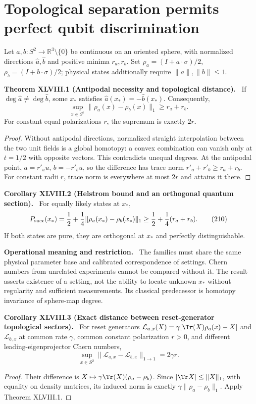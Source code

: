 \documentclass[11pt,a4paper,oneside]{book}
\newcommand{\R}{\mathbb R}\newcommand{\C}{\mathbb C}\newcommand{\Z}{\mathbb Z}\newcommand{\N}{\mathbb N}\newcommand{\Q}{\mathbb Q}
\newcommand{\statement}[3]{\par\medskip\noindent\textbf{#1 #2 (#3).}\ }
\newcommand{\note}[1]{\par\medskip\noindent\textbf{#1}\ }
\begin{document}
\section{Topological separation permits perfect qubit discrimination}
Let $a,b:S^2\to\R^3\setminus\{0\}$ be continuous on an oriented sphere, with normalized directions $\widehat a,\widehat b$ and positive minima $r_a,r_b$. Set $\rho_a=(I+a\cdot\sigma)/2$, $\rho_b=(I+b\cdot\sigma)/2$; physical states additionally require $\|a\|,\|b\|\le1$.
\statement{Theorem}{XLVIII.1}{Antipodal necessity and topological distance}
If $\deg\widehat a\ne\deg\widehat b$, some $x_*$ satisfies $\widehat a(x_*)=-\widehat b(x_*)$. Consequently,
\begin{equation}\sup_{x\in S^2}\|\rho_a(x)-\rho_b(x)\|_1\ge r_a+r_b.\tag{209}\end{equation}
For constant equal polarizations $r$, the supremum is exactly $2r$.
\begin{proof}
Without antipodal directions, normalized straight interpolation between the two unit fields is a global homotopy: a convex combination can vanish only at $t=1/2$ with opposite vectors. This contradicts unequal degrees. At the antipodal point, $a=r'_au$, $b=-r'_bu$, so the difference has trace norm $r'_a+r'_b\ge r_a+r_b$. For constant radii $r$, trace norm is everywhere at most $2r$ and attains it there.
\end{proof}
\statement{Corollary}{XLVIII.2}{Helstrom bound and an orthogonal quantum section}
For equally likely states at $x_*$,
\begin{equation}P_{\rm succ}(x_*)=\frac12+\frac14\|\rho_a(x_*)-\rho_b(x_*)\|_1\ge\frac12+\frac14(r_a+r_b).\tag{210}\end{equation}
If both states are pure, they are orthogonal at $x_*$ and perfectly distinguishable.
\note{Operational meaning and restriction.} The families must share the same physical parameter base and calibrated correspondence of settings. Chern numbers from unrelated experiments cannot be compared without it. The result asserts existence of a setting, not the ability to locate unknown $x_*$ without regularity and sufficient measurements. Its classical predecessor is homotopy invariance of sphere-map degree.
\statement{Corollary}{XLVIII.3}{Exact distance between reset-generator topological sectors}
For reset generators $\mathcal L_{a,x}(X)=\gamma[\Tr(X)\rho_a(x)-X]$ and $\mathcal L_{b,x}$ at common rate $\gamma$, common constant polarization $r>0$, and different leading-eigenprojector Chern numbers,
\begin{equation}\sup_{x\in S^2}\|\mathcal L_{a,x}-\mathcal L_{b,x}\|_{1\to1}=2\gamma r.\tag{211}\end{equation}
\begin{proof}
Their difference is $X\mapsto\gamma\Tr(X)(\rho_a-\rho_b)$. Since $|\Tr X|\le\|X\|_1$, with equality on density matrices, its induced norm is exactly $\gamma\|\rho_a-\rho_b\|_1$. Apply Theorem XLVIII.1.
\end{proof}
\end{document}
